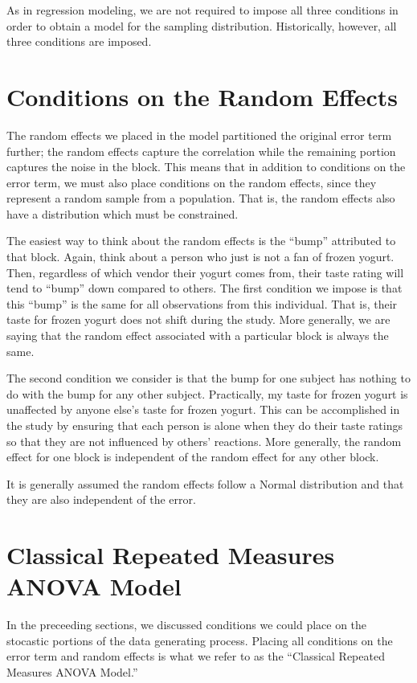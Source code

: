 \documentclass[]{book}
\theoremstyle{plain}
\theoremstyle{mydefn}
\theoremstyle{myexmpl}
\theoremstyle{remark}
\begin{document}
As in regression modeling, we are not required to impose all three
conditions in order to obtain a model for the sampling distribution.
Historically, however, all three conditions are imposed.

\section{Conditions on the Random
Effects}\label{conditions-on-the-random-effects}

The random effects we placed in the model partitioned the original error
term further; the random effects capture the correlation while the
remaining portion captures the noise in the block. This means that in
addition to conditions on the error term, we must also place conditions
on the random effects, since they represent a random sample from a
population. That is, the random effects also have a distribution which
must be constrained.

The easiest way to think about the random effects is the ``bump''
attributed to that block. Again, think about a person who just is not a
fan of frozen yogurt. Then, regardless of which vendor their yogurt
comes from, their taste rating will tend to ``bump'' down compared to
others. The first condition we impose is that this ``bump'' is the same
for all observations from this individual. That is, their taste for
frozen yogurt does not shift during the study. More generally, we are
saying that the random effect associated with a particular block is
always the same.

The second condition we consider is that the bump for one subject has
nothing to do with the bump for any other subject. Practically, my taste
for frozen yogurt is unaffected by anyone else's taste for frozen
yogurt. This can be accomplished in the study by ensuring that each
person is alone when they do their taste ratings so that they are not
influenced by others' reactions. More generally, the random effect for
one block is independent of the random effect for any other block.

It is generally assumed the random effects follow a Normal distribution
and that they are also independent of the error.

\section{Classical Repeated Measures ANOVA
Model}\label{classical-repeated-measures-anova-model}

In the preceeding sections, we discussed conditions we could place on
the stocastic portions of the data generating process. Placing all
conditions on the error term and random effects is what we refer to as
the ``Classical Repeated Measures ANOVA Model.''
\end{document}
